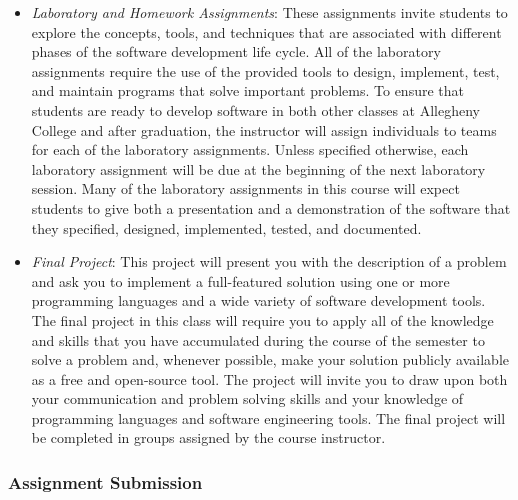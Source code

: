 \begin{itemize}
    \item {\em Laboratory and Homework Assignments}: These assignments invite students to explore the concepts, tools,
        and techniques that are associated with different phases of the software development life cycle.  All of the
        laboratory assignments require the use of the provided tools to design, implement, test, and maintain programs
        that solve important problems.  To ensure that students are ready to develop software in both other classes at
        Allegheny College and after graduation, the instructor will assign individuals to teams for each of the
        laboratory assignments.  Unless specified otherwise, each laboratory assignment will be due at the beginning of
        the next laboratory session.  Many of the laboratory assignments in this course will expect students to
        give both a presentation and a demonstration of the software that they specified, designed, implemented, tested,
        and documented.


    \item {\em Final Project}: This project will present you with the description of a problem and ask you to implement
      a full-featured solution using one or more programming languages and a wide variety of software development tools.
      The final project in this class will require you to apply all of the knowledge and skills that you have
      accumulated during the course of the semester to solve a problem and, whenever possible, make your solution
      publicly available as a free and open-source tool.  The project will invite you to draw upon both your
      communication and problem solving skills and your knowledge of programming languages and software engineering
      tools. The final project will be completed in groups assigned by the course instructor.

\end{itemize}

\subsubsection*{Assignment Submission}


